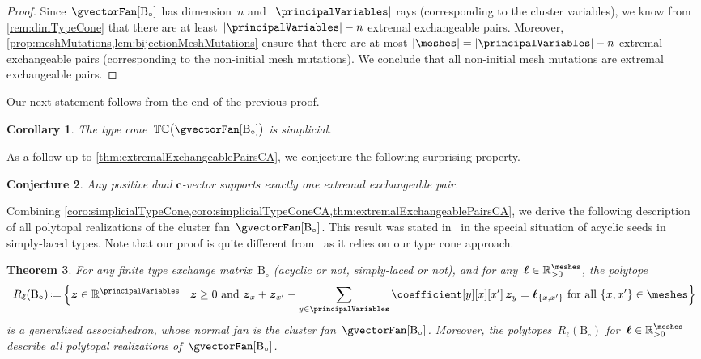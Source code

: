 \documentclass{amsart}
\newtheorem{theorem}{Theorem}[section]
\newtheorem{corollary}[theorem]{Corollary}
\newtheorem{conjecture}[theorem]{Conjecture}
\theoremstyle{definition}
\newcommand{\R}{\mathbb{R}} %
\renewcommand{\b}[1]{{\boldsymbol{#1}}} %
\newcommand{\Bigset}[2]{\Big\{ #1 \;\Big|\; #2 \Big\}} %
\newcommand{\eqdef}{\mbox{\,\raisebox{0.2ex}{\scriptsize\ensuremath{\mathrm:}}\ensuremath{=}\,}} %
\newcommand{\typeCone}{\mathbb{TC}} %
\newcommand{\B}{\mathrm{B}} %
\begin{document}
\begin{proof}
Since~$\gvectorFan[\B_\circ]$ has dimension~$n$ and~$|\principalVariables|$ rays (corresponding to the cluster variables), we know from \cref{rem:dimTypeCone} that there are at least~$|\principalVariables| - n$ extremal exchangeable pairs.
Moreover, \cref{prop:meshMutations,lem:bijectionMeshMutations} ensure that there are at most $|\meshes| = |\principalVariables| - n$ extremal exchangeable pairs (corresponding to the non-initial mesh mutations).
We conclude that all non-initial mesh mutations are extremal exchangeable pairs.
\end{proof}

Our next statement follows from the end of the previous proof.

\begin{corollary}
\label{coro:simplicialTypeConeCA}
The type cone~$\typeCone \big( \gvectorFan[\B_\circ] \big)$ is simplicial.
\end{corollary}

As a follow-up to \cref{thm:extremalExchangeablePairsCA}, we conjecture the following surprising property.

\begin{conjecture}
Any positive dual $\b{c}$-vector supports exactly one extremal exchangeable pair.
\end{conjecture}

Combining \cref{coro:simplicialTypeCone,coro:simplicialTypeConeCA,thm:extremalExchangeablePairsCA}, we derive the following description of all polytopal realizations of the cluster fan~$\gvectorFan[\B_\circ]$.
This result was stated in~\cite{BazierMatteDouvilleMousavandThomasYildirim} in the special situation of acyclic seeds in simply-laced types.
Note that our proof is quite different from~\cite{BazierMatteDouvilleMousavandThomasYildirim} as it relies on our type cone approach.

\begin{theorem}
\label{thm:allPolytopalRealizationsCA}
For any finite type exchange matrix~$\B_\circ$ (acyclic or not, simply-laced or not), and for any~$\b{\ell} \in \R_{>0}^{\meshes}$, the polytope
\[
R_{\b{\ell}}(\B_\circ) \eqdef \Bigset{\b{z} \in \R^{\principalVariables}}{\b{z} \ge 0 \text{ and } \b{z}_x + \b{z}_{x'} - \sum_{y \in \principalVariables} \coefficient[y][x][x'] \, \b{z}_{y} = \b{\ell}_{\{x,x'\}} \text{ for all } \{x,x'\} \in \meshes}
\]
is a generalized associahedron, whose normal fan is the cluster fan~$\gvectorFan[\B_\circ]$.
Moreover, the polytopes~$R_\b{\ell}(\B_\circ)$ for~$\b{\ell} \in \R_{>0}^{\meshes}$ describe all polytopal realizations of~$\gvectorFan[\B_\circ]$.
\end{theorem}
\end{document}
